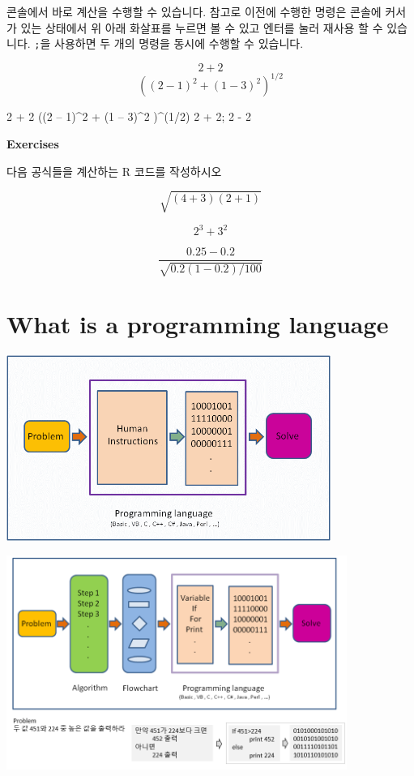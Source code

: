 \documentclass[
]{book}
\newenvironment{Shaded}{\begin{snugshade}}{\end{snugshade}}
\newcommand{\DecValTok}[1]{\textcolor[rgb]{0.00,0.00,0.81}{#1}}
\newcommand{\NormalTok}[1]{#1}
\newcommand{\SpecialCharTok}[1]{\textcolor[rgb]{0.00,0.00,0.00}{#1}}
\begin{document}
콘솔에서 바로 계산을 수행할 수 있습니다. 참고로 이전에 수행한 명령은 콘솔에 커서가 있는 상태에서 위 아래 화살표를 누르면 볼 수 있고 엔터를 눌러 재사용 할 수 있습니다. \texttt{;}을 사용하면 두 개의 명령을 동시에 수행할 수 있습니다.

\[ 2 + 2 \]
\[ ((2 - 1)^2 + (1 - 3)^2)^{1/2} \]

\begin{Shaded}
\begin{Highlighting}[]
\DecValTok{2} \SpecialCharTok{+} \DecValTok{2}
\NormalTok{((}\DecValTok{2}\NormalTok{ – }\DecValTok{1}\NormalTok{)}\SpecialCharTok{\^{}}\DecValTok{2} \SpecialCharTok{+}\NormalTok{ (}\DecValTok{1}\NormalTok{ – }\DecValTok{3}\NormalTok{)}\SpecialCharTok{\^{}}\DecValTok{2}\NormalTok{ )}\SpecialCharTok{\^{}}\NormalTok{(}\DecValTok{1}\SpecialCharTok{/}\DecValTok{2}\NormalTok{)}
\DecValTok{2} \SpecialCharTok{+} \DecValTok{2}\NormalTok{; }\DecValTok{2} \SpecialCharTok{{-}} \DecValTok{2}
\end{Highlighting}
\end{Shaded}

\textbf{Exercises}

다음 공식들을 계산하는 R 코드를 작성하시오

\[ \sqrt{(4+3)(2+1)} \]

\[ 2^3 + 3^2 \]

\[ \frac{0.25 - 0.2}{\sqrt{0.2 (1-0.2)/100}}\]

\hypertarget{what-is-a-programming-language}{%
\section{What is a programming language}\label{what-is-a-programming-language}}

\includegraphics[width=4.16667in,height=\textheight]{images/01/24.PNG}

\includegraphics[width=4.375in,height=\textheight]{images/01/25.PNG}
\end{document}
